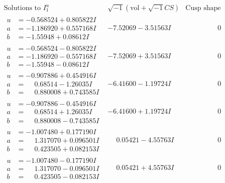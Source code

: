 \documentclass[1p]{elsarticle_modified}
\theoremstyle{definition}
\newcommand{\I}{\sqrt{-1}}
\begin{document}
$$\begin{array}{c|c|c}  
\text{Solutions to }I^u_{1}& \I (\text{vol} + \sqrt{-1}CS) & \text{Cusp shape}\\
 \hline 
\begin{aligned}
u &= -0.568524 + 0.805822 I \\
a &= -1.186920 + 0.557168 I \\
b &= -1.55948 + 0.08612 I\end{aligned}
 & -7.52069 - 3.51563 I & \phantom{-0.000000 } 0 \\ \hline\begin{aligned}
u &= -0.568524 - 0.805822 I \\
a &= -1.186920 - 0.557168 I \\
b &= -1.55948 - 0.08612 I\end{aligned}
 & -7.52069 + 3.51563 I & \phantom{-0.000000 } 0 \\ \hline\begin{aligned}
u &= -0.907886 + 0.454916 I \\
a &= \phantom{-}0.68514 - 1.26035 I \\
b &= \phantom{-}0.880008 + 0.743585 I\end{aligned}
 & -6.41600 - 1.19724 I & \phantom{-0.000000 } 0 \\ \hline\begin{aligned}
u &= -0.907886 - 0.454916 I \\
a &= \phantom{-}0.68514 + 1.26035 I \\
b &= \phantom{-}0.880008 - 0.743585 I\end{aligned}
 & -6.41600 + 1.19724 I & \phantom{-0.000000 } 0 \\ \hline\begin{aligned}
u &= -1.007480 + 0.177190 I \\
a &= \phantom{-}1.317070 + 0.096501 I \\
b &= \phantom{-}0.423505 + 0.082153 I\end{aligned}
 & \phantom{-}0.05421 - 4.55763 I & \phantom{-0.000000 } 0 \\ \hline\begin{aligned}
u &= -1.007480 - 0.177190 I \\
a &= \phantom{-}1.317070 - 0.096501 I \\
b &= \phantom{-}0.423505 - 0.082153 I\end{aligned}
 & \phantom{-}0.05421 + 4.55763 I & \phantom{-0.000000 } 0 \\ \hline\begin{aligned}

\end{aligned}
\end{array}$$
\end{document}
